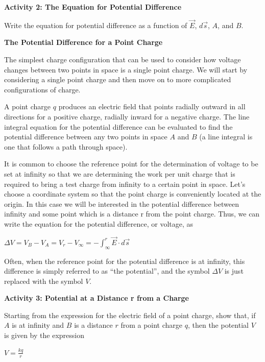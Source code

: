 \textbf{Activity 2: The Equation for Potential Difference}

Write the equation for potential difference as a function of \( \overrightarrow{E} \),
\( d\overrightarrow{s} \), $A$, and $B$.
\answerspace{15mm}

\textbf{The Potential Difference for a Point Charge}

The simplest charge configuration that can be used to consider how
voltage changes between two points in space is a single point charge.
We will start by considering a single point charge and then move on
to more complicated configurations of charge.

A point charge $q$ produces an electric field that points radially outward
in all directions for a positive charge, radially inward for a negative charge. The line integral equation for the potential difference
can be evaluated to find the potential difference between any two
points in space $A$ and $B$ (a line integral is one that follows a path
through space).

It is common to choose the reference point for the determination of
voltage to be set at infinity so that we are determining the work
per unit charge that is required to bring a test charge from infinity
to a certain point in space. Let's choose a coordinate system so that
the point charge is conveniently located at the origin. In this case
we will be interested in the potential difference between infinity
and some point which is a distance r from the point charge. Thus,
we can write the equation for the potential difference, or voltage,
as

{\centering \( \Delta V=V_{B}-V_{A}=V_{r}-V_{\infty }=-\int ^{r}_{\infty }\overrightarrow{E}\cdot d\overrightarrow{s} \)\par}

Often, when the reference point for the potential difference is at
infinity, this difference is simply referred to as {}``the potential'',
and the symbol \( \Delta V \) is just replaced with the symbol $V$.

\pagebreak[2]
\textbf{Activity 3: Potential at a Distance r from a Charge}

Starting from the expression for the electric field of a point charge,
show that, if $A$ is at infinity and $B$ is a distance $r$ from a point
charge $q$, then the potential $V$ is given by the expression

{\centering \( V=\frac{kq}{r} \)\par}

